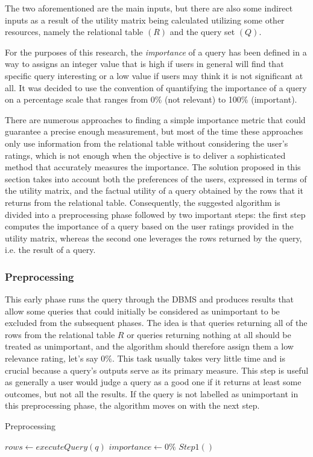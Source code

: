 The two aforementioned are the main inputs, but there are also some indirect inputs as a result of the utility matrix being calculated utilizing some other resources, namely the relational table $(R)$ and the query set $(Q)$. 

\begin{definition}[Importance]
For the purposes of this research, the \emph{importance} of a query has been defined in a way to assigns an integer value that is high if users in general will find that specific query interesting or a low value if users may think it is not significant at all. It was decided to use the convention of quantifying the importance of a query on a percentage scale that ranges from 0\% (not relevant) to 100\% (important).
\end{definition}


There are numerous approaches to finding a simple importance metric that could guarantee a precise enough measurement, but most of the time these approaches only use information from the relational table without considering the user's ratings, which is not enough when the objective is to deliver a sophisticated method that accurately measures the importance. The solution proposed in this section takes into account both the preferences of the users, expressed in terms of the utility matrix, and the factual utility of a query obtained by the rows that it returns from the relational table. Consequently, the suggested algorithm is divided into a preprocessing phase followed by two important steps: the first step computes the importance of a query based on the user ratings provided in the utility matrix, whereas the second one leverages the rows returned by the query, i.e. the result of a query.

\subsubsection{Preprocessing}
This early phase runs the query through the DBMS and produces results that allow some queries that could initially be considered as unimportant to be excluded from the subsequent phases. The idea is that queries returning all of the rows from the relational table $R$ or queries returning nothing at all should be treated as unimportant, and the algorithm should therefore assign them a low relevance rating, let's say $0\%$. This task usually takes very little time and is crucial because a query's outputs serve as its primary measure. 
This step is useful as generally a user would judge a query as a good one if it returns at least some outcomes, but not all the results. If the query is not labelled as unimportant in this preprocessing phase, the algorithm moves on with the next step.
\begin{algorithm}[h]
    \caption{Preprocessing} 
    \begin{algorithmic}[1]
        \State $rows \gets executeQuery(q)$
            \State $importance \gets 0\%$
        \Else
            \State $Step1()$
        \EndIf
    \end{algorithmic} 
    \label{alg:PartB_Preprocessing}
\end{algorithm}


